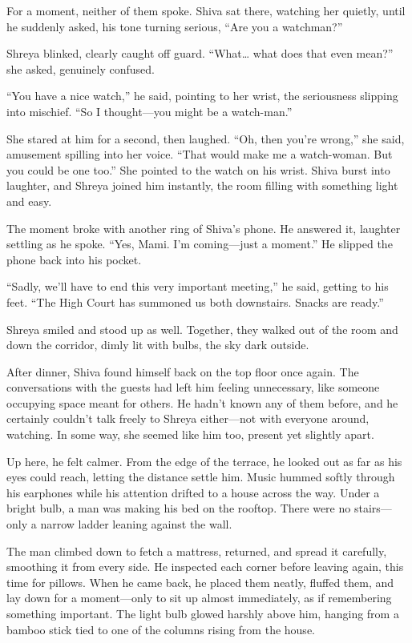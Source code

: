 For a moment, neither of them spoke. Shiva sat there, watching her quietly, until he suddenly asked, his tone turning serious, ``Are you a watchman?''

Shreya blinked, clearly caught off guard. ``What… what does that even mean?'' she asked, genuinely confused.

``You have a nice watch,'' he said, pointing to her wrist, the seriousness slipping into mischief. ``So I thought—you might be a watch-man.''

She stared at him for a second, then laughed. ``Oh, then you're wrong,'' she said, amusement spilling into her voice. ``That would make me a watch-woman. But you could be one too.'' She pointed to the watch on his wrist. Shiva burst into laughter, and Shreya joined him instantly, the room filling with something light and easy.

The moment broke with another ring of Shiva's phone. He answered it, laughter settling as he spoke. ``Yes, Mami. I'm coming—just a moment.'' He slipped the phone back into his pocket.

``Sadly, we'll have to end this very important meeting,'' he said, getting to his feet. ``The High Court has summoned us both downstairs. Snacks are ready.''

Shreya smiled and stood up as well. Together, they walked out of the room and down the corridor, dimly lit with bulbs, the sky dark outside.

After dinner, Shiva found himself back on the top floor once again. The conversations with the guests had left him feeling unnecessary, like someone occupying space meant for others. He hadn't known any of them before, and he certainly couldn't talk freely to Shreya either—not with everyone around, watching. In some way, she seemed like him too, present yet slightly apart.

Up here, he felt calmer. From the edge of the terrace, he looked out as far as his eyes could reach, letting the distance settle him. Music hummed softly through his earphones while his attention drifted to a house across the way. Under a bright bulb, a man was making his bed on the rooftop. There were no stairs—only a narrow ladder leaning against the wall.

The man climbed down to fetch a mattress, returned, and spread it carefully, smoothing it from every side. He inspected each corner before leaving again, this time for pillows. When he came back, he placed them neatly, fluffed them, and lay down for a moment—only to sit up almost immediately, as if remembering something important. The light bulb glowed harshly above him, hanging from a bamboo stick tied to one of the columns rising from the house.

